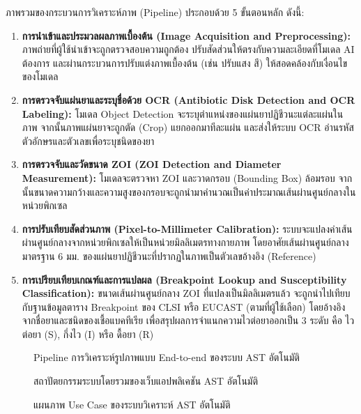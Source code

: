ภาพรวมของกระบวนการวิเคราะห์ภาพ (Pipeline) ประกอบด้วย 5 ขั้นตอนหลัก ดังนี้:
\begin{enumerate}
  \item \textbf{การนำเข้าและประมวลผลภาพเบื้องต้น (Image Acquisition and Preprocessing):} ภาพถ่ายที่ผู้ใช้นำเข้าจะถูกตรวจสอบความถูกต้อง ปรับสัดส่วนให้ตรงกับความละเอียดที่โมเดล AI ต้องการ และผ่านกระบวนการปรับแต่งภาพเบื้องต้น (เช่น ปรับแสง สี) ให้สอดคล้องกับเงื่อนไขของโมเดล
  \item \textbf{การตรวจจับแผ่นยาและระบุชื่อด้วย OCR (Antibiotic Disk Detection and OCR Labeling):} โมเดล Object Detection จะระบุตำแหน่งของแผ่นยาปฏิชีวนะแต่ละแผ่นในภาพ จากนั้นภาพแผ่นยาจะถูกตัด (Crop) แยกออกมาทีละแผ่น และส่งให้ระบบ OCR อ่านรหัสตัวอักษรและตัวเลขเพื่อระบุชนิดของยา
  \item \textbf{การตรวจจับและวัดขนาด ZOI (ZOI Detection and Diameter Measurement):} โมเดลจะตรวจหา ZOI และวาดกรอบ (Bounding Box) ล้อมรอบ จากนั้นขนาดความกว้างและความสูงของกรอบจะถูกนำมาคำนวณเป็นค่าประมาณเส้นผ่านศูนย์กลางในหน่วยพิกเซล
  \item \textbf{การปรับเทียบสัดส่วนภาพ (Pixel-to-Millimeter Calibration):} ระบบจะแปลงค่าเส้นผ่านศูนย์กลางจากหน่วยพิกเซลให้เป็นหน่วยมิลลิเมตรทางกายภาพ โดยอาศัยเส้นผ่านศูนย์กลางมาตรฐาน 6 มม. ของแผ่นยาปฏิชีวนะที่ปรากฏในภาพเป็นตัวเลขอ้างอิง (Reference)
  \item \textbf{การเปรียบเทียบเกณฑ์และการแปลผล (Breakpoint Lookup and Susceptibility Classification):} ขนาดเส้นผ่านศูนย์กลาง ZOI ที่แปลงเป็นมิลลิเมตรแล้ว จะถูกนำไปเทียบกับฐานข้อมูลตาราง Breakpoint ของ CLSI หรือ EUCAST (ตามที่ผู้ใช้เลือก) โดยอ้างอิงจากชื่อยาและชนิดของเชื้อแบคทีเรีย เพื่อสรุปผลการจำแนกความไวต่อยาออกเป็น 3 ระดับ คือ ไวต่อยา (S), กึ่งไว (I) หรือ ดื้อยา (R)
\end{enumerate}

\begin{figure}[H]
  \centering
  \caption{Pipeline การวิเคราะห์รูปภาพแบบ End-to-end ของระบบ AST อัตโนมัติ}
  \label{fig:pipeline}
\end{figure}

\begin{figure}[H]
  \centering
  \caption{สถาปัตยกรรมระบบโดยรวมของเว็บแอปพลิเคชัน AST อัตโนมัติ}
  \label{fig:sys_arch}
\end{figure}

\begin{figure}[H]
  \centering
  \caption{แผนภาพ Use Case ของระบบวิเคราะห์ AST อัตโนมัติ}
  \label{fig:use_case}
\end{figure}


